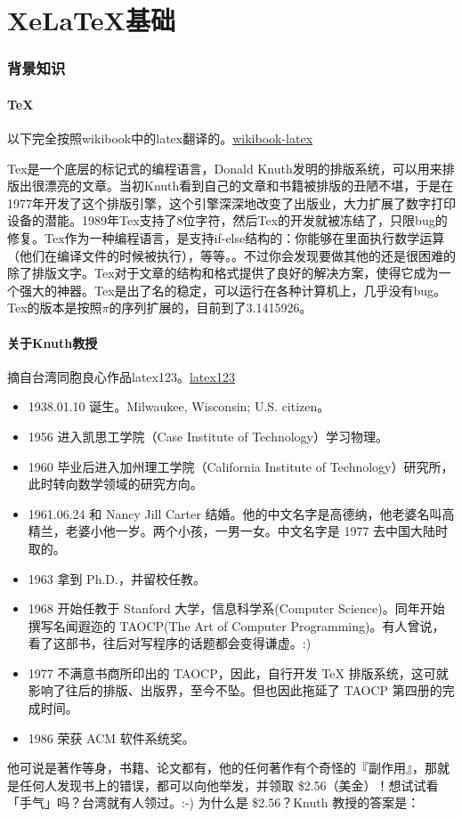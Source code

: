 \part{XeLaTeX基础}
\section{背景知识}
\subsection{TeX}
以下完全按照wikibook中的latex翻译的。\href{http://en.wikibooks.org/wiki/LaTeX/Introduction}{wikibook-latex}

Tex是一个底层的标记式的编程语言，Donald Knuth发明的排版系统，可以用来排版出很漂亮的文章。当初Knuth看到自己的文章和书籍被排版的丑陋不堪，于是在1977年开发了这个排版引擎，这个引擎深深地改变了出版业，大力扩展了数字打印设备的潜能。1989年Tex支持了8位字符，然后Tex的开发就被冻结了，只限bug的修复。Tex作为一种编程语言，是支持if-else结构的：你能够在里面执行数学运算（他们在编译文件的时候被执行），等等。。不过你会发现要做其他的还是很困难的除了排版文字。Tex对于文章的结构和格式提供了良好的解决方案，使得它成为一个强大的神器。Tex是出了名的稳定，可以运行在各种计算机上，几乎没有bug。Tex的版本是按照$\pi$的序列扩展的，目前到了3.1415926。

\subsection{关于Knuth教授}
摘自台湾同胞良心作品latex123。\href{http://cle.linux.org.tw/~edt1023/tex/latex123/node2.html}{latex123}
\begin{itemize}
\item 1938.01.10	诞生。Milwaukee, Wisconsin; U.S. citizen。
\item 1956	进入凯思工学院（Case Institute of Technology）学习物理。
\item 1960	毕业后进入加州理工学院（California Institute of Technology）研究所，此时转向数学领域的研究方向。
\item 1961.06.24	和 Nancy Jill Carter 结婚。他的中文名字是高德纳，他老婆名叫高精兰，老婆小他一岁。两个小孩，一男一女。中文名字是 1977 去中国大陆时取的。
\item 1963	拿到 Ph.D.，并留校任教。
\item 1968	开始任教于 Stanford 大学，信息科学系(Computer Science)。同年开始撰写名闻遐迩的 TAOCP(The Art of Computer Programming)。有人曾说，看了这部书，往后对写程序的话题都会变得谦虚。:)
\item 1977	不满意书商所印出的 TAOCP，因此，自行开发 TeX 排版系统，这可就影响了往后的排版、出版界，至今不坠。但也因此拖延了 TAOCP 第四册的完成时间。
\item 1986	荣获 ACM 软件系统奖。
\end{itemize}
他可说是著作等身，书籍、论文都有，他的任何著作有个奇怪的『副作用』，那就是任何人发现书上的错误，都可以向他举发，并领取 \$2.56（美金）！想试试看「手气」吗？台湾就有人领过。:-) 为什么是 \$2.56？Knuth 教授的答案是：

